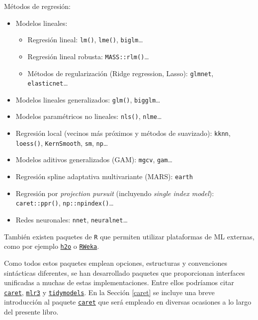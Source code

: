 \documentclass[
  spanish,
]{book}
\theoremstyle{break}
\theoremstyle{definition}
\theoremstyle{definition}
\theoremstyle{definition}
\theoremstyle{definition}
\theoremstyle{remark}
\begin{document}
Métodos de regresión:

\begin{itemize}
\item
  Modelos lineales:

  \begin{itemize}
  \item
    Regresión lineal: \texttt{lm()}, \texttt{lme()}, \texttt{biglm}\ldots{}
  \item
    Regresión lineal robusta: \texttt{MASS::rlm()}\ldots{}
  \item
    Métodos de regularización (Ridge regression, Lasso):
    \texttt{glmnet}, \texttt{elasticnet}\ldots{}
  \end{itemize}
\item
  Modelos lineales generalizados: \texttt{glm()}, \texttt{bigglm}\ldots{}
\item
  Modelos paramétricos no lineales: \texttt{nls()}, \texttt{nlme}\ldots{}
\item
  Regresión local (vecinos más próximos y métodos de suavizado):
  \texttt{kknn}, \texttt{loess()}, \texttt{KernSmooth}, \texttt{sm}, \texttt{np}\ldots{}
\item
  Modelos aditivos generalizados (GAM): \texttt{mgcv}, \texttt{gam}\ldots{}
\item
  Regresión spline adaptativa multivariante (MARS): \texttt{earth}
\item
  Regresión por \emph{projection pursuit} (incluyendo \emph{single index model}): \texttt{caret::ppr()}, \texttt{np::npindex()}\ldots{}
\item
  Redes neuronales: \texttt{nnet}, \texttt{neuralnet}\ldots{}
\end{itemize}

También existen paquetes de \texttt{R} que permiten utilizar plataformas de ML externas, como por ejemplo \href{https://github.com/h2oai/h2o-3/tree/master/h2o-r}{\texttt{h2o}} o \href{https://CRAN.R-project.org/package=RWeka}{\texttt{RWeka}}.

Como todos estos paquetes emplean opciones, estructuras y convenciones sintácticas diferentes, se han desarrollado paquetes que proporcionan interfaces unificadas a muchas de estas implementaciones.
Entre ellos podríamos citar \href{https://topepo.github.io/caret}{\texttt{caret}}, \href{https://mlr3.mlr-org.com}{\texttt{mlr3}} y \href{https://www.tidymodels.org}{\texttt{tidymodels}}.
En la Sección \ref{caret} se incluye una breve introducción al paquete \href{https://topepo.github.io/caret}{\texttt{caret}} que será empleado en diversas ocasiones a lo largo del presente libro.
\end{document}
